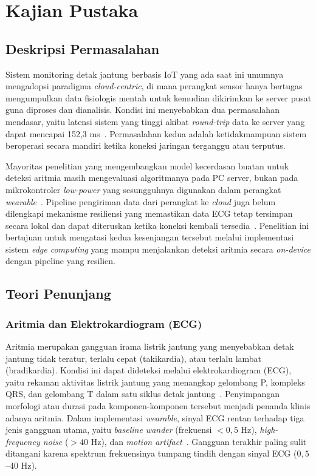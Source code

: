 \chapter{Kajian Pustaka}
\label{chap:kajian-pustaka}

\section{Deskripsi Permasalahan}
\label{sec:deskripsi-permasalahan}

Sistem monitoring detak jantung berbasis IoT yang ada saat ini umumnya mengadopsi paradigma \textit{cloud-centric}, di mana perangkat sensor hanya bertugas mengumpulkan data fisiologis mentah untuk kemudian dikirimkan ke server pusat guna diproses dan dianalisis. Kondisi ini menyebabkan dua permasalahan mendasar, yaitu latensi sistem yang tinggi akibat \textit{round-trip} data ke server yang dapat mencapai 152,3 ms~\cite{al_quayed_2026}. Permasalahan kedua adalah ketidakmampuan sistem beroperasi secara mandiri ketika koneksi jaringan terganggu atau terputus.

Mayoritas penelitian yang mengembangkan model kecerdasan buatan untuk deteksi aritmia masih mengevaluasi algoritmanya pada PC server, bukan pada mikrokontroler \textit{low-power} yang sesungguhnya digunakan dalam perangkat \textit{wearable}~\cite{tinyml_iot_review}. Pipeline pengiriman data dari perangkat ke \textit{cloud} juga belum dilengkapi mekanisme resiliensi yang memastikan data ECG tetap tersimpan secara lokal dan dapat diteruskan ketika koneksi kembali tersedia~\cite{yaacoub_2020, escobedo_2026}. Penelitian ini bertujuan untuk mengatasi kedua kesenjangan tersebut melalui implementasi sistem \textit{edge computing} yang mampu menjalankan deteksi aritmia secara \textit{on-device} dengan pipeline yang resilien.

\section{Teori Penunjang}
\label{sec:teori-penunjang}

\subsection{Aritmia dan Elektrokardiogram (ECG)}
\label{subsec:aritmia-ecg}

Aritmia merupakan gangguan irama listrik jantung yang menyebabkan detak jantung tidak teratur, terlalu cepat (takikardia), atau terlalu lambat (bradikardia). Kondisi ini dapat dideteksi melalui elektrokardiogram (ECG), yaitu rekaman aktivitas listrik jantung yang menangkap gelombang P, kompleks QRS, dan gelombang T dalam satu siklus detak jantung~\cite{ecg_goldberger}. Penyimpangan morfologi atau durasi pada komponen-komponen tersebut menjadi penanda klinis adanya aritmia. Dalam implementasi \textit{wearable}, sinyal ECG rentan terhadap tiga jenis gangguan utama, yaitu \textit{baseline wander} (frekuensi $< 0{,}5$ Hz), \textit{high-frequency noise} ($> 40$ Hz), dan \textit{motion artifact}~\cite{sornmo_laguna_2005}. Gangguan terakhir paling sulit ditangani karena spektrum frekuensinya tumpang tindih dengan sinyal ECG ($0{,}5$--$40$ Hz).

